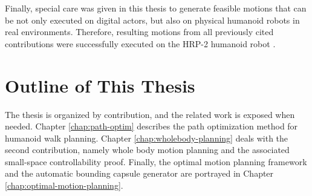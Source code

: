 Finally, special care was given in this thesis to generate feasible
motions that can be not only executed on digital actors, but also on
physical humanoid robots in real environments. Therefore, resulting
motions from all previously cited contributions were successfully
executed on the HRP-2 humanoid robot \cite{kane04}.

\section{Outline of This Thesis}

The thesis is organized by contribution, and the related work is
exposed when needed. Chapter \ref{chap:path-optim} describes the path
optimization method for humanoid walk planning. Chapter
\ref{chap:wholebody-planning} deals with the second contribution,
namely whole body motion planning and the associated small-space
controllability proof. Finally, the optimal motion planning framework
and the automatic bounding capsule generator are portrayed in Chapter
\ref{chap:optimal-motion-planning}.
